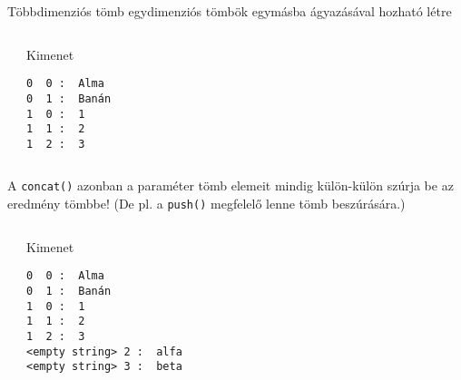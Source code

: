 \begin{frame}[fragile]
  Többdimenziós tömb egydimenziós tömbök egymásba ágyazásával hozható létre
  \vfill
  \scriptsize
  \begin{columns}[T]
      \begin{exampleblock}{}
        
      \end{exampleblock}
      \begin{block}{Kimenet}
        \begin{verbatim}
0  0 :  Alma
0  1 :  Banán
1  0 :  1
1  1 :  2
1  2 :  3
\end{verbatim}
      \end{block}
  \end{columns}
\end{frame}

\begin{frame}[fragile]
  A \texttt{concat()} azonban a paraméter tömb elemeit mindig külön-külön szúrja be az eredmény tömbbe! (De pl. a \texttt{push()} megfelelő lenne tömb beszúrására.)
  \vfill
  \footnotesize
  \begin{columns}[T]
      \begin{exampleblock}{}
        
      \end{exampleblock}
      \begin{block}{Kimenet}
        \begin{verbatim}
0  0 :  Alma
0  1 :  Banán
1  0 :  1
1  1 :  2
1  2 :  3
<empty string> 2 :  alfa
<empty string> 3 :  beta
\end{verbatim}
      \end{block}
  \end{columns}
\end{frame}

